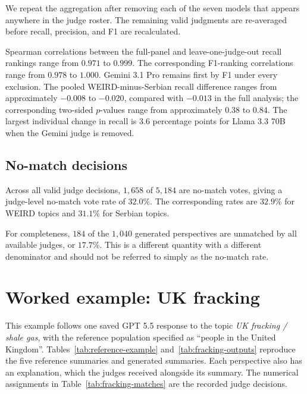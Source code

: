 \documentclass[11pt,a4paper]{article}
\begin{document}
We repeat the aggregation after removing each of the seven models that appears anywhere in the judge roster. The remaining valid judgments are re-averaged before recall, precision, and F1 are recalculated.

Spearman correlations between the full-panel and leave-one-judge-out recall rankings range from $0.971$ to $0.999$. The corresponding F1-ranking correlations range from $0.978$ to $1.000$. Gemini 3.1 Pro remains first by F1 under every exclusion. The pooled WEIRD-minus-Serbian recall difference ranges from approximately $-0.008$ to $-0.020$, compared with $-0.013$ in the full analysis; the corresponding two-sided $p$-values range from approximately $0.38$ to $0.84$. The largest individual change in recall is $3.6$ percentage points for Llama 3.3 70B when the Gemini judge is removed.

\subsection{No-match decisions}
\label{app:no_match}

Across all valid judge decisions, $1,658$ of $5,184$ are no-match votes, giving a judge-level no-match vote rate of $32.0$\%. The corresponding rates are $32.9$\% for WEIRD topics and $31.1$\% for Serbian topics.

For completeness, $184$ of the $1,040$ generated perspectives are unmatched by all available judges, or $17.7$\%. This is a different quantity with a different denominator and should not be referred to simply as the no-match rate.



\section{Worked example: UK fracking}
\label{app:worked-example}
This example follows one saved GPT 5.5 response to the topic \emph{UK fracking / shale gas}, with the reference population specified as ``people in the United Kingdom''. Tables~\ref{tab:reference-example} and~\ref{tab:fracking-outputs} reproduce the five reference summaries and generated summaries. Each perspective also has an explanation, which the judges received alongside its summary. The numerical assignments in Table~\ref{tab:fracking-matches} are the recorded judge decisions.
\end{document}
